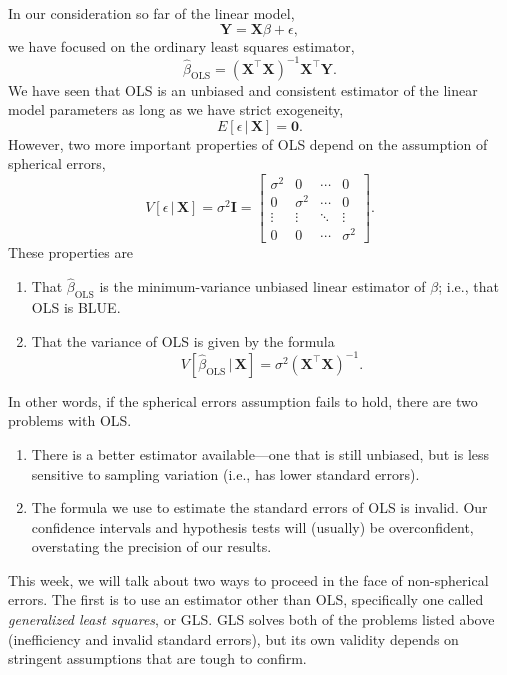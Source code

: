 \documentclass[12pt,oneside,openany]{book}
\begin{document}
In our consideration so far of the linear model, \[
\mathbf{Y} = \mathbf{X} \beta + \epsilon,
\] we have focused on the ordinary least squares estimator, \[
\hat{\beta}_{\text{OLS}} = (\mathbf{X}^\top \mathbf{X})^{-1} \mathbf{X}^\top \mathbf{Y}.
\] We have seen that OLS is an unbiased and consistent estimator of the
linear model parameters as long as we have strict exogeneity, \[
E[\epsilon \,|\, \mathbf{X}] = \mathbf{0}.
\] However, two more important properties of OLS depend on the
assumption of spherical errors, \[
V[\epsilon \,|\, \mathbf{X}] = \sigma^2 \mathbf{I} = \begin{bmatrix}
  \sigma^2 & 0 & \cdots & 0 \\
  0 & \sigma^2 & \cdots & 0 \\
  \vdots & \vdots & \ddots & \vdots \\
  0 & 0 & \cdots & \sigma^2
\end{bmatrix}.
\] These properties are

\begin{enumerate}
\def\labelenumi{\arabic{enumi}.}
\item
  That \(\hat{\beta}_{\text{OLS}}\) is the minimum-variance unbiased
  linear estimator of \(\beta\); i.e., that OLS is BLUE.
\item
  That the variance of OLS is given by the formula \[
  V[\hat{\beta}_{\text{OLS}} \,|\, \mathbf{X}] = \sigma^2 (\mathbf{X}^\top \mathbf{X})^{-1}.
  \]
\end{enumerate}

In other words, if the spherical errors assumption fails to hold, there
are two problems with OLS.

\begin{enumerate}
\def\labelenumi{\arabic{enumi}.}
\item
  There is a better estimator available---one that is still unbiased,
  but is less sensitive to sampling variation (i.e., has lower standard
  errors).
\item
  The formula we use to estimate the standard errors of OLS is invalid.
  Our confidence intervals and hypothesis tests will (usually) be
  overconfident, overstating the precision of our results.
\end{enumerate}

This week, we will talk about two ways to proceed in the face of
non-spherical errors. The first is to use an estimator other than OLS,
specifically one called \emph{generalized least squares}, or GLS. GLS
solves both of the problems listed above (inefficiency and invalid
standard errors), but its own validity depends on stringent assumptions
that are tough to confirm.
\end{document}
